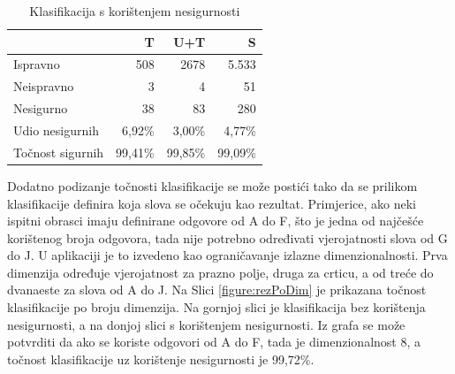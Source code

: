 \documentclass[a4paper,twocolumn,dvipdfm]{article}
\begin{document}
\begin{table}[htb]
\centering
\begin{tabular}{lrrr} \toprule
 & T & U+T & S \\ \midrule
Ispravno & 508 & 2678 & 5.533 \\
Neispravno & 3 & 4 & 51 \\
Nesigurno & 38 & 83 & 280 \\
Udio nesigurnih & 6,92\% & 3,00\% & 4,77\% \\
Točnost sigurnih & 99,41\% & 99,85\% & 99,09\% \\ \bottomrule
\end{tabular}
\caption{Klasifikacija s korištenjem nesigurnosti}
\label{table:rezultati2}
\end{table}

Dodatno podizanje točnosti klasifikacije se može postići tako da se prilikom
klasifikacije definira koja slova se očekuju kao rezultat. Primjerice, ako neki
ispitni obrasci imaju definirane odgovore od A do F, što je jedna od najčešće
korištenog broja odgovora, tada nije potrebno određivati vjerojatnosti slova od
G do J. U aplikaciji je to izvedeno kao ograničavanje izlazne dimenzionalnosti.
Prva dimenzija određuje vjerojatnost za prazno polje, druga za crticu, a od
treće do dvanaeste za slova od A do J. Na Slici \ref{figure:rezPoDim} je
prikazana točnost klasifikacije po broju dimenzija. Na gornjoj slici je
klasifikacija bez korištenja nesigurnosti, a na donjoj slici s korištenjem
nesigurnosti. Iz grafa se može potvrditi da ako se koriste odgovori od A do F,
tada je dimenzionalnost 8, a točnost klasifikacije uz korištenje nesigurnosti je
99,72\%.
\end{document}
